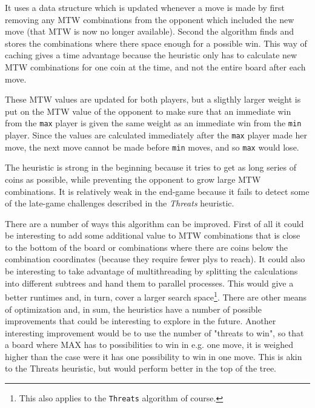 \documentclass[a4paper, titlepage]{article}
\begin{document}
It uses a data structure which is updated whenever a move is made by first 
removing any MTW combinations from the opponent which included the new move (that MTW is 
now no longer available). Second the algorithm finds and stores the combinations where 
there space enough for a possible win.
This way of caching gives a time advantage because the heuristic only has to calculate new MTW 
combinations for one coin at the time, and not the entire board after each move.

These MTW values are updated for both players, but a sligthly larger weight is put on the 
MTW value of the opponent to make sure that an immediate win from the \texttt{max} player 
is given the same weight as an immediate win from the \texttt{min} player. Since the values 
are calculated immediately after the \texttt{max} player made her move, the next move cannot
be made before \texttt{min} moves, and so \texttt{max} would lose.

The heuristic is strong in the beginning because it tries to get as long series of coins
as possible, while preventing the opponent to grow large MTW combinations. It is 
relatively weak in the end-game because it fails to detect some of the late-game challenges 
described in the \textit{Threats} heuristic. 

There are a number of ways this algorithm can be improved. First of all it could be
interesting to add some additional value to MTW combinations that is close to the bottom of
the board or combinations where there are coins below the combination coordinates 
(because they require fewer plys to reach). It could also be interesting to take advantage
of multithreading by splitting the calculations into different subtrees and hand them to 
parallel processes. This would give a better runtimes and, in turn,
cover a larger search space\footnote{This also applies to the \texttt{Threats} algorithm
of course.}. There are other means of optimization and, in sum, the heuristics have a 
number of possible improvements that could be interesting to explore in the future.
Another interesting improvement would be to use the number of "threats to win",
so that a board where MAX has to possibilities to win in e.g. one move, it is
weighed higher than the case were it has one possibility to win in one move.
This is akin to the Threats heuristic, but would perform better in the top of
the tree.
\end{document}
